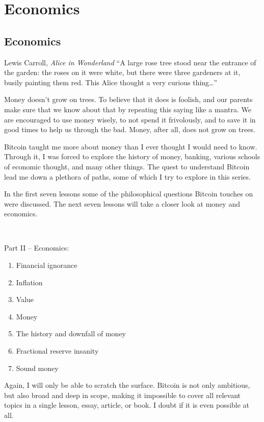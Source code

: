 \part{Economics}
\label{ch:economics}
\chapter*{Economics}

\begin{chapquote}{Lewis Carroll, \textit{Alice in Wonderland}}
``A large rose tree stood near the entrance of the garden: the roses on it were
white, but there were three gardeners at it, busily painting them red. This
Alice thought a very curious thing\ldots''
\end{chapquote}

Money doesn’t grow on trees. To believe that it does is foolish, and our
parents make sure that we know about that by repeating this saying like a
mantra. We are encouraged to use money wisely, to not spend it frivolously,
and to save it in good times to help us through the bad. Money, after all,
does not grow on trees.

Bitcoin taught me more about money than I ever thought I would need to know.
Through it, I was forced to explore the history of money, banking, various
schools of economic thought, and many other things. The quest to understand
Bitcoin lead me down a plethora of paths, some of which I try to explore in
this series.

In the first seven lessons some of the philosophical questions Bitcoin touches
on were discussed. The next seven lessons will take a closer look at money and
economics.

~

Part II -- Economics:

\begin{enumerate}
  \item Financial ignorance
  \item Inflation
  \item Value
  \item Money
  \item The history and downfall of money
  \item Fractional reserve insanity
  \item Sound money
\end{enumerate}

Again, I will only be able to scratch the surface. Bitcoin is not only
ambitious, but also broad and deep in scope, making it impossible to cover all
relevant topics in a single lesson, essay, article, or book. I  doubt if it is
even possible at all.

